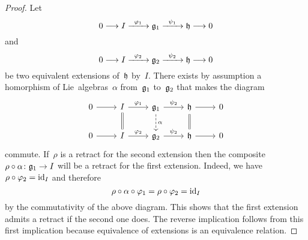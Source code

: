 \begin{proof}
  Let
  \[
    0
    \to
    I
    \xto{\varphi_1}
    \glie_1
    \xto{\psi_1}
    \hlie
    \to
    0
  \]
  and
  \[
    0
    \to
    I
    \xto{\varphi_2}
    \glie_2
    \xto{\psi_2}
    \hlie
    \to
    0
  \]
  be two equivalent extensions of~$\mathfrak{h}$ by~$I$.
  There exists by assumption a homorphism of Lie~algebras~$\alpha$ from~$\mathfrak{g}_1$ to~$\mathfrak{g}_2$ that makes the diagram
  \[
    \begin{tikzcd}
      0
      \arrow{r}
      &
      I
      \arrow{r}[above]{\varphi_1}
      \arrow[equal]{d}
      &
      \glie_1
      \arrow{r}[above]{\psi_2}
      \arrow[dashed]{d}[right]{\alpha}
      &
      \hlie
      \arrow{r}
      \arrow[equal]{d}
      &
      0
      \\
      0
      \arrow{r}
      &
      I
      \arrow{r}[above]{\varphi_2}
      &
      \glie_2
      \arrow{r}[above]{\psi_2}
      &
      \hlie
      \arrow{r}
      &
      0
    \end{tikzcd}
  \]
  commute.
  If~$\rho$ is a retract for the second extension then the composite~$\rho \circ \alpha \colon \glie_1 \to I$ will be a retract for the first extension.
  Indeed, we have~$\rho \circ \varphi_2 = \mathrm{id}_I$ and therefore
  \[
    \rho \circ \alpha \circ \varphi_1
    =
    \rho \circ \varphi_2
    =
    \mathrm{id}_I
  \]
  by the commutativity of the above diagram.
  This shows that the first extension admits a retract if the second one does.
  The reverse implication follows from this first implication because equivalence of extensions is an equivalence relation.
\end{proof}


